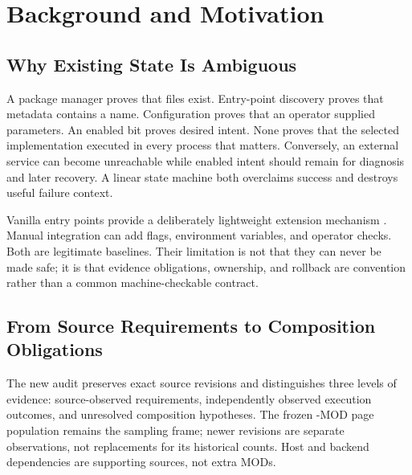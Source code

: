 \documentclass[letterpaper,twocolumn,10pt]{article}
\begin{document}
\section{Background and Motivation}
\subsection{Why Existing State Is Ambiguous}
A package manager proves that files exist.  Entry-point discovery proves that
metadata contains a name.  Configuration proves that an operator supplied
parameters.  An enabled bit proves desired intent.  None proves that the
selected implementation executed in every process that matters.  Conversely,
an external service can become unreachable while enabled intent should remain
for diagnosis and later recovery.  A linear state machine both overclaims
success and destroys useful failure context.

Vanilla entry points provide a deliberately lightweight extension mechanism
\cite{vllm-plugin}.  Manual integration can add flags, environment variables,
and operator checks.  Both are legitimate baselines.  Their limitation is not
that they can never be made safe; it is that evidence obligations, ownership,
and rollback are convention rather than a common machine-checkable contract.

\subsection{From Source Requirements to Composition Obligations}
The new audit preserves exact source revisions and distinguishes three
levels of evidence: source-observed requirements, independently observed
execution outcomes, and unresolved composition hypotheses. The frozen
\ECPAWorkshopMods{}-MOD page population remains the sampling frame;
newer revisions are separate observations, not replacements for its historical
counts. Host and backend dependencies are supporting sources, not extra MODs.
\end{document}

